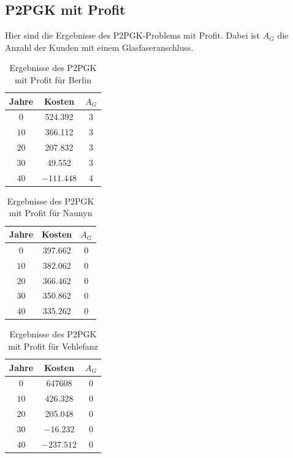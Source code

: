 \documentclass[11pt,a4paper]{article}
\theoremstyle{my_th_style1}
\begin{document}
\subsection*{P2PGK mit Profit}
Hier sind die Ergebnisse des P2PGK-Problems mit Profit. Dabei ist $A_G$ die Anzahl der Kunden mit einem Glasfaseranschluss.
\begin{table}[h]
	\centering
	\begin{tabular}{c|c|c}
		\centering
		Jahre & Kosten & $A_G$ \\	
		\hline
		$0$   	 &  524.392 & 3  \\
		$10$ 	&   366.112& 3  \\
		$20$   	&   207.832 & 3  \\
		$30$    &   49.552 & 3  \\
		$40$    & $-111.448$ & 4 \\
	\end{tabular}
	\label{P2PGKProfit}
	\caption{Ergebnisse des P2PGK mit Profit f\"ur Berlin} 
\end{table}

\begin{table}[h]
	\centering
	\begin{tabular}{c|c|c}
		\centering
		Jahre & Kosten & $A_G$ \\	
		\hline
		$0$   	 &  397.662& 0  \\
		$10$ 	&  382.062 & 0  \\
		$20$   	&  366.462  & 0  \\
		$30$    &  350.862 & 0  \\
		$40$    &  335.262  & 0 \\
	\end{tabular}
	\label{P2PGKProfitN}
	\caption{Ergebnisse des P2PGK mit Profit f\"ur Naunyn} 
\end{table}

\begin{table}[h]
	\centering
	\begin{tabular}{c|c|c}
		\centering
		Jahre & Kosten & $A_G$ \\	
		\hline
		$0$   	 & 647608  &0  \\
		$10$ 	&  426.328 & 0  \\
		$20$   	&  205.048  & 0  \\
		$30$    & $-16.232$& 0  \\
		$40$    &  $-237.512$ & 0 \\
	\end{tabular}
	\label{P2PGKProfitV}
	\caption{Ergebnisse des P2PGK mit Profit f\"ur Vehlefanz} 
\end{table}
\end{document}
